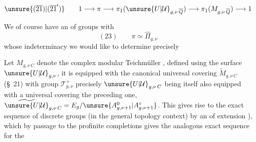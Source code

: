 

\[
\unsure{(\overline{21})|(\overline{21}')}\qquad
1\longrightarrow\pi\longrightarrow\pi_1(\unsure{U|\mathcal{U}}_{g,\nu\,\overline{Q}})
\longrightarrow\pi_1(M_{g,\nu\,\overline{Q}})\longrightarrow1
\]

We of course have an  of groups with 
\[
(23)\qquad \pi\simeq\widehat{\Pi}_{g,\nu}
\]
whose indeterminacy we would like to determine precisely

Let $M_{g,\nu\,C}$ denote the complex modular Teichmüller , defined using the  surface $\unsure{U|\mathcal{U}}_{g,\nu}$, it is equipped with the canonical universal covering $\widetilde{M}_{g,\nu\,C}$ (\S~21)
with group  $\mathcal{T}_{g,\nu}^{+}$ precisely 
$\unsure{U|\mathcal{U}}_{g,\nu\,C}$ being itself also equipped with a universal covering  the preceding one,
$\widetilde{\unsure{U|\mathcal{U}}}_{g,\nu\,C}=E_g/\unsure{A_{g,\nu+1}^{0}|A_{g,\nu+1}^{\circ}}$.
This gives rise to the exact sequence of discrete groups (in the general topology context)
by an  of extension ), which by passage to the profinite completions gives the analogous exact sequence for the

